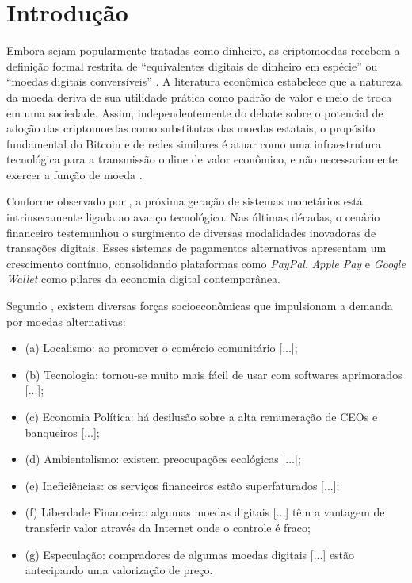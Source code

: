 \documentclass[
    12pt,                %
    openright,           %
    oneside,             %
    a4paper,             %
    english,             %
    brazil               %
]{abntex2}
\begin{document}
\chapter{Introdução}
\label{cap:introducao}

Embora sejam popularmente tratadas como dinheiro, as criptomoedas recebem a definição formal restrita de 
``equivalentes digitais de dinheiro em espécie'' ou ``moedas digitais conversíveis'' \cite{papadopoulos2024blockchain}.  
A literatura econômica estabelece que a natureza da moeda deriva de sua utilidade prática como padrão de valor e meio 
de troca em uma sociedade. Assim, independentemente do debate sobre o potencial de adoção das criptomoedas como 
substitutas das moedas estatais, o propósito fundamental do Bitcoin e de redes similares é atuar como uma infraestrutura 
tecnológica para a transmissão online de valor econômico, e não necessariamente 
exercer a função de moeda \cite{papadopoulos2024blockchain}.

Conforme observado por , a próxima geração de sistemas monetários está intrinsecamente ligada ao avanço tecnológico. Nas últimas décadas, 
o cenário financeiro testemunhou o surgimento de diversas modalidades inovadoras de transações digitais. Esses sistemas de pagamentos alternativos apresentam 
um crescimento contínuo, consolidando plataformas como \textit{PayPal}, \textit{Apple Pay} e \textit{Google Wallet} como pilares da economia digital contemporânea.

Segundo , existem diversas forças socioeconômicas que impulsionam a demanda por moedas alternativas:
\begin{citacao}
    \begin{itemize}
        \item (a) Localismo: ao promover o comércio comunitário [...]; 
	    \item (b) Tecnologia: tornou-se muito mais fácil de usar com softwares aprimorados [...]; 
	    \item (c) Economia Política: há desilusão sobre a alta remuneração de CEOs e banqueiros [...]; 
	    \item (d) Ambientalismo: existem preocupações ecológicas [...]; 
        \item (e) Ineficiências: os serviços financeiros estão superfaturados [...];
	    \item (f) Liberdade Financeira: algumas moedas digitais [...] têm a vantagem de transferir valor através da Internet onde o controle é fraco; 
	    \item (g) Especulação: compradores de algumas moedas digitais [...] estão antecipando uma valorização de preço.
    \end{itemize}
\end{citacao}
\end{document}
